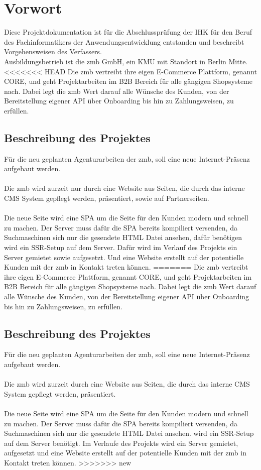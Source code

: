 \documentclass[11pt,a4paper]{article}
\begin{document}
\section{Vorwort}
Diese Projektdokumentation ist für die Abschlussprüfung der IHK für den Beruf des Fachinformatikers der Anwendungsentwicklung entstanden und beschreibt Vorgehensweisen des Verfassers.\\
Ausbildungsbetrieb ist die zmb GmbH, ein \acs{KMU} mit Standort in Berlin Mitte.
<<<<<<< HEAD
Die zmb vertreibt ihre eigen E-Commerce Plattform, genannt CORE, und geht Projektarbeiten im \acs{B2B} Bereich für alle gängigen Shopsysteme nach.
Dabei legt die zmb Wert darauf alle Wünsche des Kunden, von der Bereitstellung eigener API über Onboarding bis hin zu Zahlungsweisen, zu erfüllen.
\subsection{Beschreibung des Projektes}
Für die neu geplanten Agenturarbeiten der zmb, soll eine neue Internet-Präsenz aufgebaut werden.\\\\
Die zmb wird zurzeit nur durch eine Website aus Seiten, die durch das interne CMS System gepflegt werden, präsentiert, sowie auf Partnerseiten.\\\\
Die neue Seite wird eine \acs{SPA} um die Seite für den Kunden modern und schnell zu machen.
Der Server muss dafür die \acs{SPA} bereits kompiliert versenden, da Suchmaschinen sich nur die gesendete HTML Datei ansehen, dafür benötigen wird ein \acs{SSR}-Setup auf dem Server.
Dafür wird im Verlauf des Projekts ein Server gemietet sowie aufgesetzt. Und eine Website erstellt auf der potentielle Kunden mit der zmb in Kontakt treten können.
=======
Die zmb vertreibt ihre eigen E-Commerce Plattform, genannt CORE, und geht Projektarbeiten im \acs{B2B} Bereich für alle gängigen Shopsysteme nach.  
Dabei legt die zmb Wert darauf alle Wünsche des Kunden, von der Bereitstellung eigener API über Onboarding bis hin zu Zahlungsweisen, zu erfüllen. 
\subsection{Beschreibung des Projektes}
Für die neu geplanten Agenturarbeiten der zmb, soll eine neue Internet-Präsenz aufgebaut werden.\\\\
Die zmb wird zurzeit durch eine Website aus Seiten, die durch das interne CMS System gepflegt werden, präsentiert.\\\\
Die neue Seite wird eine \acs{SPA} um die Seite für den Kunden modern und schnell zu machen.  
Der Server muss dafür die \acs{SPA} bereits kompiliert versenden, da Suchmaschinen sich nur die gesendete HTML Datei ansehen. wird ein \acs{SSR}-Setup auf dem Server benötigt.
Im Verlaufe des Projekts wird ein Server gemietet, aufgesetzt und eine Website erstellt auf der potentielle Kunden mit der zmb in Kontakt treten können.  
>>>>>>> new
\end{document}
